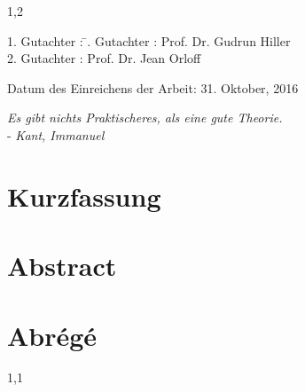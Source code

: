 \documentclass[11pt,a4paper,twoside]{article}
\numberwithin{equation}{section}
\begin{document}
\begin{spacing}{1,2}
\thispagestyle{empty}
\vspace*{\fill}
\begin{tabbing}
1. Gutachter : \=. Gutachter : \>Prof. Dr. Gudrun Hiller \\[11pt]
2. Gutachter : \>Prof. Dr. Jean Orloff \\[11pt]
\end{tabbing}
\vspace{11pt}
Datum des Einreichens der Arbeit: 31. Oktober, 2016
\newpage
\thispagestyle{empty}
\begin{flushright} 
\textit{\grqq Es gibt nichts Praktischeres, als eine gute Theorie.\grqq}\\
- \textit{Kant, Immanuel}\\
\vspace{2cm}
\end{flushright}

\newpage



\thispagestyle{empty}
 \section*{Kurzfassung}

 \section*{Abstract}

 \section*{Abrégé}
 \newpage


\end{spacing}
\begin{spacing}{1,1}
\tableofcontents\newpage

\end{spacing}
\end{document}
